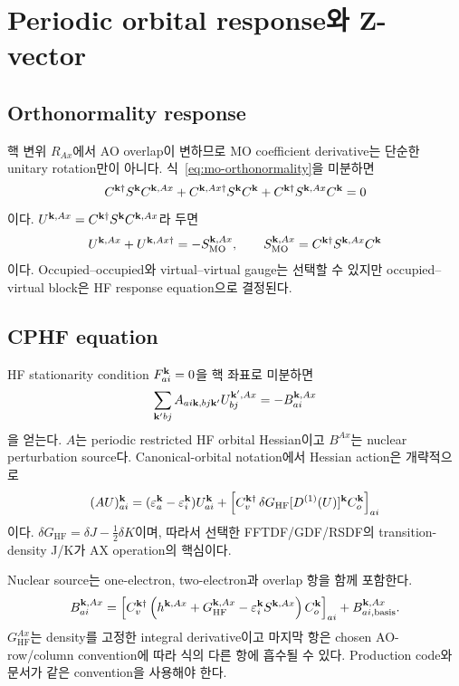 \section{Periodic orbital response와 Z-vector}
\label{sec:orbital-response}

\subsection{Orthonormality response}

핵 변위 $R_{Ax}$에서 AO overlap이 변하므로 MO coefficient derivative는 단순한
unitary rotation만이 아니다. 식~\eqref{eq:mo-orthonormality}을 미분하면
\begin{equation}
  C^{\mathbf{k}\dagger}S^{\mathbf{k}}C^{\mathbf{k},Ax}
  +C^{\mathbf{k},Ax\dagger}S^{\mathbf{k}}C^{\mathbf{k}}
  +C^{\mathbf{k}\dagger}S^{\mathbf{k},Ax}C^{\mathbf{k}}=0
  \label{eq:orthonormality-response}
\end{equation}
이다. $U^{\mathbf{k},Ax}=C^{\mathbf{k}\dagger}S^{\mathbf{k}}C^{\mathbf{k},Ax}$라 두면
\begin{equation}
  U^{\mathbf{k},Ax}+U^{\mathbf{k},Ax\dagger}
  =-S_{\mathrm{MO}}^{\mathbf{k},Ax},
  \qquad
  S_{\mathrm{MO}}^{\mathbf{k},Ax}=C^{\mathbf{k}\dagger}S^{\mathbf{k},Ax}C^{\mathbf{k}}
  \label{eq:u-overlap-constraint}
\end{equation}
이다. Occupied--occupied와 virtual--virtual gauge는 선택할 수 있지만 occupied--virtual
block은 HF response equation으로 결정된다.

\subsection{CPHF equation}

HF stationarity condition $F_{ai}^{\mathbf{k}}=0$을 핵 좌표로 미분하면
\begin{equation}
  \sum_{\mathbf{k}'bj}A_{ai\mathbf{k},bj\mathbf{k}'}U_{bj}^{\mathbf{k}',Ax}
  =-B_{ai}^{\mathbf{k},Ax}
  \label{eq:cphf-equation}
\end{equation}
을 얻는다. $A$는 periodic restricted HF orbital Hessian이고 $B^{Ax}$는 nuclear
perturbation source다. Canonical-orbital notation에서 Hessian action은 개략적으로
\begin{equation}
  (AU)_{ai}^{\mathbf{k}}
  =(\varepsilon_a^{\mathbf{k}}-\varepsilon_i^{\mathbf{k}})U_{ai}^{\mathbf{k}}
  +\left[C_v^{\mathbf{k}\dagger}\,\delta G_{\mathrm{HF}}[D^{(1)}(U)]^{\mathbf{k}}
  C_o^{\mathbf{k}}\right]_{ai}
  \label{eq:hf-hessian-action}
\end{equation}
이다. $\delta G_{\mathrm{HF}}=\delta J-\tfrac12\delta K$이며, 따라서 선택한
FFTDF/GDF/RSDF의 transition-density J/K가 AX operation의 핵심이다.

Nuclear source는 one-electron, two-electron과 overlap 항을 함께 포함한다.
\begin{equation}
  B_{ai}^{\mathbf{k},Ax}
  =\left[C_v^{\mathbf{k}\dagger}
    \left(h^{\mathbf{k},Ax}+G_{\mathrm{HF}}^{\mathbf{k},Ax}
          -\varepsilon_i^{\mathbf{k}}S^{\mathbf{k},Ax}\right)
    C_o^{\mathbf{k}}\right]_{ai}
  +B_{ai,\mathrm{basis}}^{\mathbf{k},Ax}.
  \label{eq:cphf-source}
\end{equation}
$G_{\mathrm{HF}}^{Ax}$는 density를 고정한 integral derivative이고 마지막 항은 chosen
AO-row/column convention에 따라 식의 다른 항에 흡수될 수 있다. Production code와
문서가 같은 convention을 사용해야 한다.

